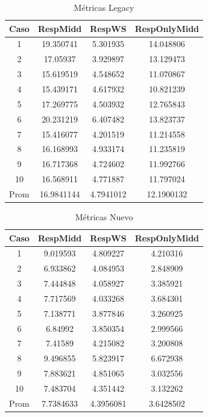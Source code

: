 \documentclass[12pt]{article}
\begin{document}
\begin{table}
\begin{center}
    \begin{tabular}{| c | c | c | c |}
\hline
    \multicolumn{1}{|c}{Caso}&
    \multicolumn{1}{|c}{RespMidd}&
    \multicolumn{1}{|c|}{RespWS}&
    \multicolumn{1}{|c|}{RespOnlyMidd} \\ \hline
    
1 & 19.350741 & 5.301935 &14.048806\\ \hline
2 & 17.05937 & 3.929897 & 13.129473\\ \hline
3 & 15.619519 & 4.548652 & 11.070867\\ \hline
4 & 15.439171 &4.617932 &10.821239\\ \hline
5 & 17.269775 & 4.503932 & 12.765843\\ \hline
6 & 20.231219 & 6.407482 & 13.823737\\ \hline
7 & 15.416077 & 4.201519 & 11.214558\\ \hline
8 & 16.168993 & 4.933174 & 11.235819\\ \hline
9 & 16.717368 & 4.724602 & 11.992766\\ \hline
10 & 16.568911 & 4.771887 & 11.797024\\ \hline
Prom & 16.9841144 & 4.7941012 & 12.1900132 \\ \hline%

    \end{tabular}
\end{center}
    \caption{Métricas Legacy}
    \label{tabla:datoslegacy}
\end{table}



\begin{table}
\begin{center}
    \begin{tabular}{| c | c | c | c |}
\hline
    \multicolumn{1}{|c}{Caso}&
    \multicolumn{1}{|c}{RespMidd}&
    \multicolumn{1}{|c|}{RespWS}&
    \multicolumn{1}{|c|}{RespOnlyMidd} \\ \hline
    
1 & 9.019593 & 4.809227 &4.210316\\ \hline
2 & 6.933862 & 4.084953 &2.848909\\ \hline
3 & 7.444848 & 4.058927 &3.385921\\ \hline
4 & 7.717569 & 4.033268 &3.684301\\ \hline
5 & 7.138771 & 3.877846 &3.260925\\ \hline
6 & 6.84992 & 3.850354 & 2.999566\\ \hline
7 & 7.41589 & 4.215082 & 3.200808\\ \hline
8 & 9.496855 & 5.823917 & 6.672938\\ \hline
9 & 7.883621 & 4.851065 & 3.032556\\ \hline
10 & 7.483704 & 4.351442 & 3.132262\\ \hline
Prom & 7.7384633 & 4.3956081 & 3.6428502\\ \hline

    \end{tabular}
\end{center}
    \caption{Métricas Nuevo}
    \label{tabla:datosnew}
\end{table}
\end{document}
